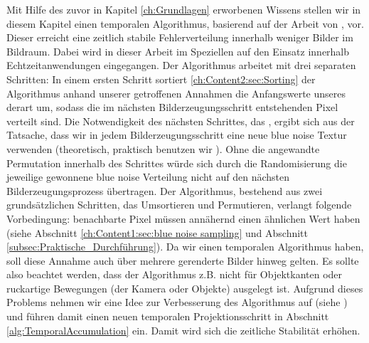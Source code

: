 Mit Hilfe des zuvor in Kapitel \ref{ch:Grundlagen} erworbenen Wissens stellen wir in diesem Kapitel einen temporalen 
Algorithmus, basierend auf der Arbeit von \cite{hal02158423}, vor. Dieser erreicht eine zeitlich stabile 
 Fehlerverteilung innerhalb weniger Bilder im Bildraum. Dabei wird in 
dieser Arbeit im Speziellen auf den Einsatz innerhalb Echtzeitanwendungen eingegangen. 
Der Algorithmus arbeitet mit drei separaten Schritten: 
In einem ersten Schritt sortiert \ref{ch:Content2:sec:Sorting} der Algorithmus anhand unserer getroffenen 
 Annahmen die Anfangswerte unseres 
derart um, sodass die im nächsten Bilderzeugungsschritt entstehenden Pixel 
verteilt sind. Die Notwendigkeit des nächsten Schrittes, das , ergibt sich 
aus der Tatsache, dass wir in jedem Bilderzeugungsschritt eine neue blue noise Textur verwenden (theoretisch,
praktisch benutzen wir ). Ohne die angewandte Permutation innerhalb 
des Schrittes würde sich durch die Randomisierung die jeweilige gewonnene blue noise Verteilung nicht auf den 
nächsten Bilderzeugungsprozess übertragen.  
Der Algorithmus, bestehend aus zwei grundsätzlichen Schritten, das Umsortieren und Permutieren, 
verlangt folgende Vorbedingung:
benachbarte Pixel müssen annähernd einen ähnlichen Wert haben (siehe Abschnitt \ref{ch:Content1:sec:blue noise sampling}
und Abschnitt \ref{subsec:Praktische_Durchführung}). Da wir einen temporalen Algorithmus haben, soll diese Annahme 
auch über mehrere gerenderte Bilder hinweg gelten. Es sollte also beachtet werden, dass der Algorithmus z.B. nicht 
für Objektkanten oder ruckartige Bewegungen (der Kamera oder Objekte) ausgelegt ist.
Aufgrund dieses Problems nehmen wir eine Idee zur Verbesserung des Algorithmus auf (siehe \cite{hal02158423}) und führen 
damit einen neuen temporalen Projektionsschritt in Abschnitt \ref{alg:TemporalAccumulation} ein. Damit wird sich die 
zeitliche Stabilität erhöhen.
 

